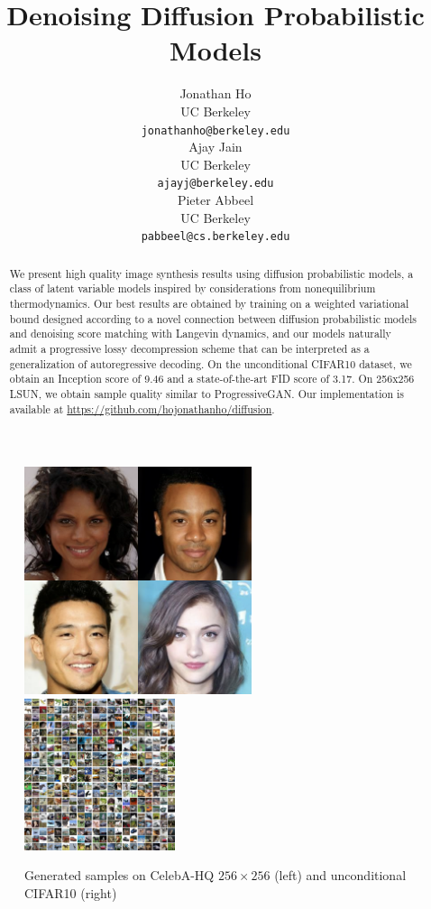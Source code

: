 \documentclass{article}
\title{Denoising Diffusion Probabilistic Models}
\author{%
  Jonathan Ho \\
  UC Berkeley \\
  \texttt{jonathanho@berkeley.edu} \\
   \And
  Ajay Jain \\
  UC Berkeley \\
  \texttt{ajayj@berkeley.edu} \\
   \And
  Pieter Abbeel \\
  UC Berkeley \\
  \texttt{pabbeel@cs.berkeley.edu}
}
\begin{document}
\begin{figure}[b!]
  \vspace{-1em}
  \centering
  \includegraphics[align=c,width=0.595\textwidth]{images/celebahq256_header_image_4x4.png}\hfill
  \includegraphics[align=c,trim=0cm 5.95cm 12cm 0cm,clip,width=0.395\textwidth]{images/cifar10_eps-fixedlarge-mse_20x20.png}
  \caption{\small{Generated samples on CelebA-HQ $256\times 256$ (left) and unconditional CIFAR10 (right)}}
  \label{fig:header_samples}
\end{figure}


\maketitle

\begin{abstract}
We present high quality image synthesis results using diffusion probabilistic models, a class of latent variable models inspired by considerations from nonequilibrium thermodynamics. Our best results are obtained by training on a weighted variational bound designed according to a novel connection between diffusion probabilistic models and denoising score matching with Langevin dynamics, and our models naturally admit a progressive lossy decompression scheme that can be interpreted as a generalization of autoregressive decoding. On the unconditional CIFAR10 dataset, we obtain an Inception score of 9.46 and a state-of-the-art FID score of 3.17. On 256x256 LSUN, we obtain sample quality similar to ProgressiveGAN. Our implementation is available at \url{https://github.com/hojonathanho/diffusion}.
\end{abstract}
\end{document}
